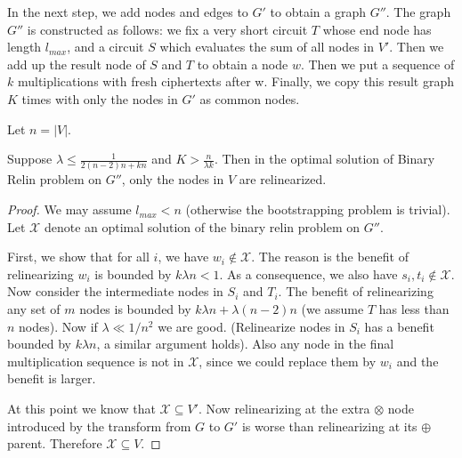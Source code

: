 \documentclass[11pt]{article} %
\theoremstyle{plain}
\theoremstyle{definition}
\begin{document}
In the next step, we add nodes and edges to $G'$ to obtain a graph $G''$. 
The graph $G''$ is constructed as follows: we fix a very short circuit $T$ whose end node has length $l_{max}$, and a circuit $S$ which evaluates 
the sum of all nodes in $V'$. Then we add up the result node of $S$ and $T$ to obtain a node $w$. Then we put a sequence of $k$ multiplications with fresh ciphertexts after w. Finally, we copy this result graph $K$ times with only the nodes in $G'$ as common nodes.  

Let $n = |V|$. 
\begin{lemma}
Suppose $\lambda  \leq \frac{1}{2(n-2)n + kn}$ and $K > \frac{n}{\lambda k}$. 
Then in the optimal solution of Binary Relin problem on $G''$, only the nodes in $V$ are relinearized. 
\end{lemma}

\begin{proof}
We may assume $l_{max} < n$ (otherwise the bootstrapping problem is trivial). Let $\mathscr{X}$  denote an optimal solution of the binary relin problem on $G''$. 

First, we show that for all $i$, we have $w_i \notin \mathscr{X}$. The reason is the benefit of relinearizing $w_i$ is bounded by $k\lambda n < 1$. 
As a consequence, we also have $s_i, t_i \notin \mathscr{X}$. Now consider the intermediate nodes in $S_i$ and $T_i$.  The benefit of relinearizing any set of $m$ nodes is bounded by $k \lambda n + \lambda (n-2) n $ (we assume $T$ has less than $n$ nodes). Now if $\lambda \ll 1/n^2$ we are good. (Relinearize nodes in $S_i$ has a benefit bounded by $k\lambda n$, a similar argument holds). Also any node in the final multiplication sequence is not in $\mathscr{X}$, since we could replace them by $w_i$ and 
the benefit is larger. 

At this point we know that $\mathscr{X} \subseteq V'$.  Now relinearizing at the extra $\otimes$ node introduced by the transform from $G$ to $G'$ is worse than relinearizing at its $\oplus$ parent. Therefore $\mathscr{X} \subseteq V$. 
\end{proof}
\end{document}
